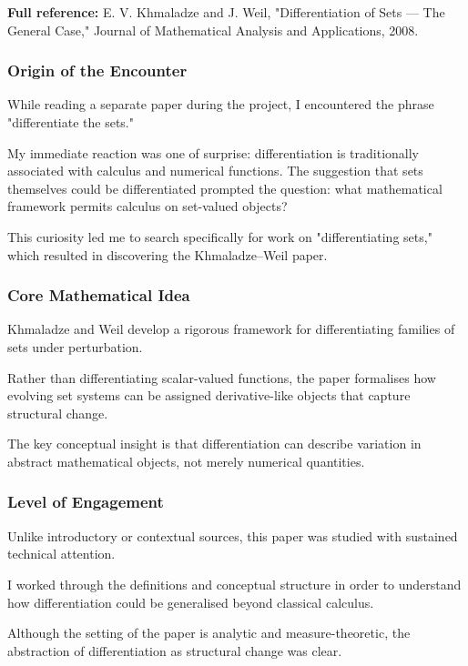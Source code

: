 \documentclass[12pt]{article}
\begin{document}
\textbf{Full reference:} E. V. Khmaladze and J. Weil,
"Differentiation of Sets --- The General Case,"
Journal of Mathematical Analysis and Applications, 2008.

\subsubsection*{Origin of the Encounter}

While reading a separate paper during the project, I encountered the phrase "differentiate the sets."

My immediate reaction was one of surprise: differentiation is traditionally associated with calculus and numerical functions. The suggestion that sets themselves could be differentiated prompted the question: what mathematical framework permits calculus on set-valued objects?

This curiosity led me to search specifically for work on "differentiating sets," which resulted in discovering the Khmaladze–Weil paper.

\subsubsection*{Core Mathematical Idea}

Khmaladze and Weil develop a rigorous framework for differentiating families of sets under perturbation.

Rather than differentiating scalar-valued functions, the paper formalises how evolving set systems can be assigned derivative-like objects that capture structural change.

The key conceptual insight is that differentiation can describe variation in abstract mathematical objects, not merely numerical quantities.

\subsubsection*{Level of Engagement}

Unlike introductory or contextual sources, this paper was studied with sustained technical attention.

I worked through the definitions and conceptual structure in order to understand how differentiation could be generalised beyond classical calculus.

Although the setting of the paper is analytic and measure-theoretic, the abstraction of differentiation as structural change was clear.
\end{document}
